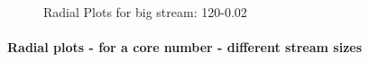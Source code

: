\documentclass[12pt,a4paper]{article}
\begin{document}
\begin{figure}[H]
    \caption{Radial Plots for big stream: 120-0.02}
    \label{img:exps-read-input-variants}
\end{figure}


\paragraph{Radial plots - for a core number - different stream sizes\\}
\newpage

\begin{figure}[H]
    \centering
\end{figure}
\end{document}
